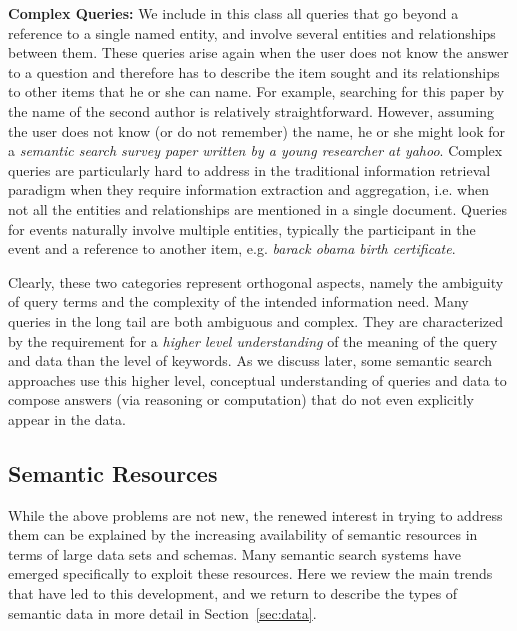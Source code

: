 	\textbf{Complex Queries:} We include in this class all queries that go beyond a reference to a single named entity, and involve several entities and relationships between them. These queries arise again when the user does not know the answer to a question and therefore has to describe the item sought and its relationships to other items that he or she can name. For example, searching for this paper by the name of the second author is relatively straightforward. However, assuming the user does not know (or do not remember) the name, he or she might look for a \emph{semantic search survey paper written by a young researcher at yahoo}. Complex queries are particularly hard to address in the traditional information retrieval paradigm when they require information extraction and aggregation, i.e. when not all the entities and relationships are mentioned in a single document. Queries for events naturally involve multiple entities, typically the participant in the event and a reference to another item, e.g. \emph{barack obama birth certificate}. 

Clearly, these two categories represent orthogonal aspects, namely the ambiguity of query terms and the complexity of the intended information need. Many queries in the long tail are both ambiguous and complex. They are characterized by the requirement for a \emph{higher level understanding} of the meaning of the query and data than the level of keywords. As we discuss later, some semantic search approaches use this higher level, conceptual understanding of queries and data to compose answers (via reasoning or computation) that do not even explicitly appear in the data. 

\subsection{Semantic Resources}

While the above problems are not new, the renewed interest in trying to address them can be explained by the increasing availability of semantic resources in terms of large data sets and schemas. Many semantic search systems have emerged specifically to exploit these resources. Here we review the main trends that have led to this development, and we return to describe the types of semantic data in more detail in Section~\ref{sec:data}. 

